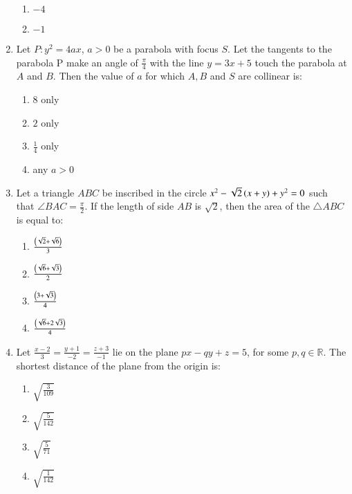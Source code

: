 \documentclass[journal,12pt,onecolumn]{IEEEtran}
\theoremstyle{remark}
\begin{document}
\begin{enumerate}[start=1]
\begin{enumerate}
			\item $-4$\\
			\item $-1$\\
		\end{enumerate}
	\item Let $P:y^2=4ax$, $a>0$ be a parabola with focus $S$. Let the tangents to the parabola P make an angle of $\frac{\pi}{4}$ with the line $y=3x+5$ touch the parabola at $A$ and $B$. Then the value of $a$ for which $A,B$ and $S$ are collinear is:
		\begin{enumerate}
			\item $8$ only\\
			\item $2$ only\\
			\item $\frac{1}{4}$ only\\
			\item any $a>0$\\
		\end{enumerate}
	\item Let a triangle $ABC$ be inscribed in the circle $x^2-\sqrt{2}\left(x+y\right)+y^2=0$ such that $\angle BAC=\frac{\pi}{2}$. If the length of side $AB$ is $\sqrt{2}$, then the area of the $\triangle ABC$ is equal to:
		\begin{enumerate}
			\item $\frac{\left(\sqrt{2}+\sqrt{6}\right)}{3}$\\
			\item $\frac{\left(\sqrt{6}+\sqrt{3}\right)}{2}$\\
			\item $\frac{\left(3+\sqrt{3}\right)}{4}$\\
			\item $\frac{\left(\sqrt{6}+2\sqrt{3}\right)}{4}$\\
		\end{enumerate}
	\item Let $\frac{x-2}{3}=\frac{y+1}{-2}=\frac{z+3}{-1}$ lie on the plane $px-qy+z=5$, for some $p, q\in\mathbb{R}$. The shortest distance of the plane from the origin is:
		\begin{enumerate}
			\item $\sqrt{\frac{3}{109}}$\\
			\item $\sqrt{\frac{5}{142}}$\\
			\item $\sqrt{\frac{5}{71}}$\\
			\item $\sqrt{\frac{1}{142}}$\\

\end{enumerate}
\end{enumerate}
\end{document}
